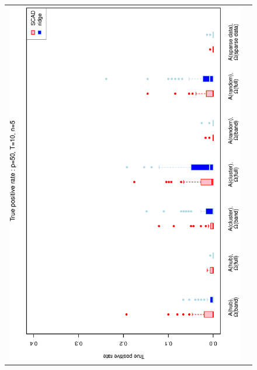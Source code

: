 \documentclass[a4paper]{article}
\begin{document}
\begin{figure}[h!]
\centering
\begin{tabular}{cc}
\includegraphics[scale=0.5,angle=270]{ROCtpr50T10N5a.eps}\\

\end{tabular}
\end{figure}
\end{document}
